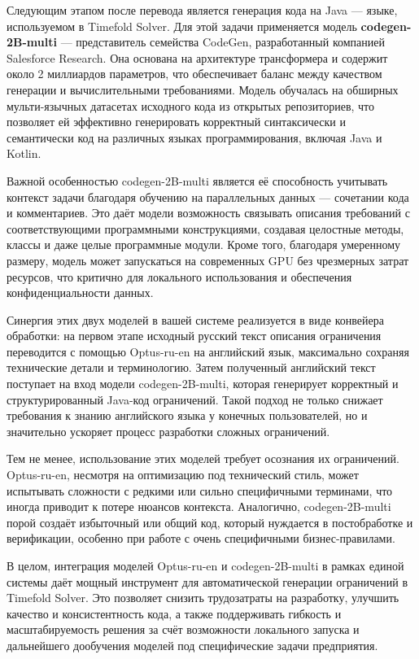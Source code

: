 Следующим этапом после перевода является генерация кода на Java — языке, используемом в Timefold Solver. Для этой задачи применяется модель \textbf{codegen-2B-multi} — представитель семейства CodeGen, разработанный компанией Salesforce Research. Она основана на архитектуре трансформера и содержит около 2 миллиардов параметров, что обеспечивает баланс между качеством генерации и вычислительными требованиями. Модель обучалась на обширных мульти-язычных датасетах исходного кода из открытых репозиториев, что позволяет ей эффективно генерировать корректный синтаксически и семантически код на различных языках программирования, включая Java и Kotlin.

Важной особенностью codegen-2B-multi является её способность учитывать контекст задачи благодаря обучению на параллельных данных — сочетании кода и комментариев. Это даёт модели возможность связывать описания требований с соответствующими программными конструкциями, создавая целостные методы, классы и даже целые программные модули. Кроме того, благодаря умеренному размеру, модель может запускаться на современных GPU без чрезмерных затрат ресурсов, что критично для локального использования и обеспечения конфиденциальности данных.

Синергия этих двух моделей в вашей системе реализуется в виде конвейера обработки: на первом этапе исходный русский текст описания ограничения переводится с помощью Optus-ru-en на английский язык, максимально сохраняя технические детали и терминологию. Затем полученный английский текст поступает на вход модели codegen-2B-multi, которая генерирует корректный и структурированный Java-код ограничений. Такой подход не только снижает требования к знанию английского языка у конечных пользователей, но и значительно ускоряет процесс разработки сложных ограничений.

Тем не менее, использование этих моделей требует осознания их ограничений. Optus-ru-en, несмотря на оптимизацию под технический стиль, может испытывать сложности с редкими или сильно специфичными терминами, что иногда приводит к потере нюансов контекста. Аналогично, codegen-2B-multi порой создаёт избыточный или общий код, который нуждается в постобработке и верификации, особенно при работе с очень специфичными бизнес-правилами.

В целом, интеграция моделей Optus-ru-en и codegen-2B-multi в рамках единой системы даёт мощный инструмент для автоматической генерации ограничений в Timefold Solver. Это позволяет снизить трудозатраты на разработку, улучшить качество и консистентность кода, а также поддерживать гибкость и масштабируемость решения за счёт возможности локального запуска и дальнейшего дообучения моделей под специфические задачи предприятия.

